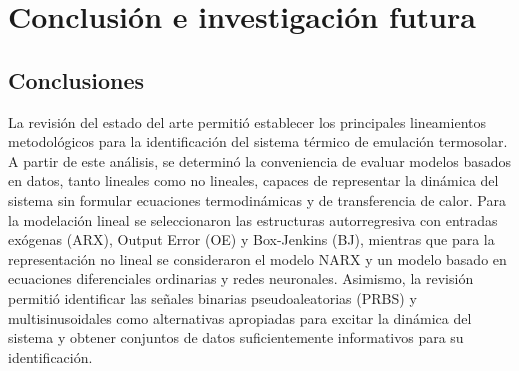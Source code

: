 \documentclass[11pt]{report}
\begin{document}
\chapter{Conclusión e investigación futura} 

\section{Conclusiones}


La revisión del estado del arte permitió establecer los principales lineamientos metodológicos para la identificación del sistema térmico de emulación termosolar. A partir de este análisis, se determinó la conveniencia de evaluar modelos basados en datos, tanto lineales como no lineales, capaces de representar la dinámica del sistema sin formular ecuaciones termodinámicas y de transferencia de calor. Para la modelación lineal se seleccionaron las estructuras autorregresiva con entradas exógenas (ARX), Output Error (OE) y Box-Jenkins (BJ), mientras que para la representación no lineal se consideraron el modelo NARX y un modelo basado en ecuaciones diferenciales ordinarias y redes neuronales. Asimismo, la revisión permitió identificar las señales binarias pseudoaleatorias (PRBS) y multisinusoidales como alternativas apropiadas para excitar la dinámica del sistema y obtener conjuntos de datos suficientemente informativos para su identificación.
\end{document}
